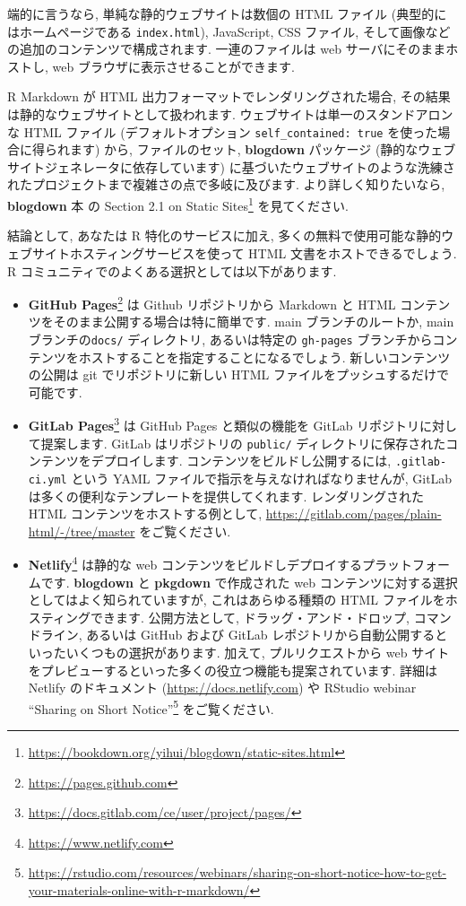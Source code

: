 \documentclass[
  11pt,
  lualatex,
  ja=standard]{bxjsreport}
\renewcommand{\href}[2]{#2\footnote{\url{#1}}}
\begin{document}
端的に言うなら, 単純な静的ウェブサイトは数個の HTML ファイル (典型的にはホームページである \texttt{index.html}), JavaScript, CSS ファイル, そして画像などの追加のコンテンツで構成されます. 一連のファイルは web サーバにそのままホストし, web ブラウザに表示させることができます.

R Markdown が HTML 出力フォーマットでレンダリングされた場合, その結果は静的なウェブサイトとして扱われます. ウェブサイトは単一のスタンドアロンな HTML ファイル (デフォルトオプション \texttt{self\_contained: true} を使った場合に得られます) から, ファイルのセット, \textbf{blogdown} パッケージ (静的なウェブサイトジェネレータに依存しています) に基づいたウェブサイトのような洗練されたプロジェクトまで複雑さの点で多岐に及びます. より詳しく知りたいなら, \textbf{blogdown} 本 \autocite{blogdown2017} の \href{https://bookdown.org/yihui/blogdown/static-sites.html}{Section 2.1 on Static Sites} を見てください.

結論として, あなたは R 特化のサービスに加え, 多くの無料で使用可能な静的ウェブサイトホスティングサービスを使って HTML 文書をホストできるでしょう. R コミュニティでのよくある選択としては以下があります.

\begin{itemize}
\item
  \href{https://pages.github.com}{\textbf{GitHub Pages}} は Github リポジトリから Markdown と HTML コンテンツをそのまま公開する場合は特に簡単です. main ブランチのルートか, main ブランチの\texttt{docs/} ディレクトリ, あるいは特定の \texttt{gh-pages} ブランチからコンテンツをホストすることを指定することになるでしょう. 新しいコンテンツの公開は git でリポジトリに新しい HTML ファイルをプッシュするだけで可能です.
\item
  \href{https://docs.gitlab.com/ce/user/project/pages/}{\textbf{GitLab Pages}} は GitHub Pages と類似の機能を GitLab リポジトリに対して提案します. GitLab はリポジトリの \texttt{public/} ディレクトリに保存されたコンテンツをデプロイします. コンテンツをビルドし公開するには, \texttt{.gitlab-ci.yml} という YAML ファイルで指示を与えなければなりませんが, GitLab は多くの便利なテンプレートを提供してくれます. レンダリングされた HTML コンテンツをホストする例として, \url{https://gitlab.com/pages/plain-html/-/tree/master} をご覧ください.
\item
  \href{https://www.netlify.com}{\textbf{Netlify}} は静的な web コンテンツをビルドしデプロイするプラットフォームです. \textbf{blogdown} と \textbf{pkgdown} で作成された web コンテンツに対する選択としてはよく知られていますが, これはあらゆる種類の HTML ファイルをホスティングできます. 公開方法として, ドラッグ・アンド・ドロップ, コマンドライン, あるいは GitHub および GitLab レポジトリから自動公開するといったいくつもの選択があります. 加えて, プルリクエストから web サイトをプレビューするといった多くの役立つ機能も提案されています. 詳細は Netlify のドキュメント (\url{https://docs.netlify.com}) や RStudio webinar \href{https://rstudio.com/resources/webinars/sharing-on-short-notice-how-to-get-your-materials-online-with-r-markdown/}{``Sharing on Short Notice''} をご覧ください.
\end{itemize}
\end{document}
